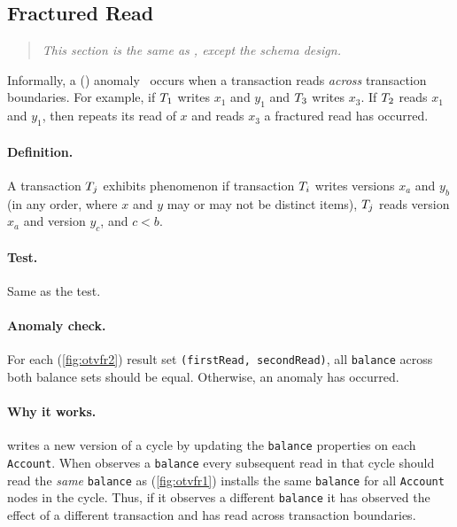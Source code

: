 \subsection{Fractured Read}
\label{sec:fractured-reads}

\begin{quote}
  \textit{This section is the same as \ldbcsnb, except the schema design.}
\end{quote}

Informally, a  () 
anomaly~\cite{DBLP:journals/tods/BailisFGHS16} occurs when a transaction reads 
\emph{across} transaction boundaries. For example, if $T_1$ writes $x_1$ 
and $y_1$ and $T_3$ writes $x_3$. If $T_2$ reads $x_1$ and $y_1$, then 
repeats its read of $x$ and reads $x_3$ a fractured read has occurred.

\paragraph{Definition.}
A transaction $T_j$ exhibits phenomenon  if transaction 
$T_i$ writes versions $x_a$ and $y_b$ (in any order, where $x$ and $y$ may 
or may not be distinct items), $T_j$ reads version $x_a$ and version $y_c$, 
and $c < b$.

\paragraph{Test.}
Same as the  test.

\paragraph{Anomaly check.}
For each   (\autoref{fig:otvfr2}) result set 
\texttt{(firstRead, secondRead)}, all \texttt{balance} across both balance sets 
should be equal. Otherwise, an  anomaly has occurred.

\paragraph{Why it works.}
 writes a new version of a cycle by updating the 
\texttt{balance} properties on each \texttt{Account}. When  
observes a \texttt{balance} every subsequent read in that cycle should read the 
\emph{same} \texttt{balance} as  (\autoref{fig:otvfr1}) 
installs the same \texttt{balance} for all \texttt{Account} nodes in the cycle.
Thus, if it observes a different \texttt{balance} it has observed the effect of 
a different transaction and has read across transaction boundaries.


